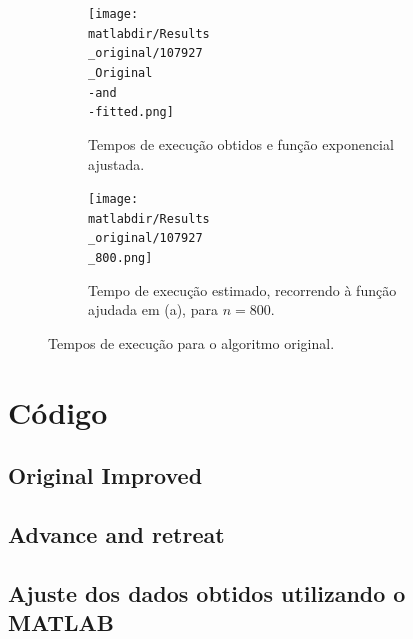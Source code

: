\documentclass[portuguese,11pt,a4paper,titlepage]{article}
\newcommand{\srcdir}{..}
\newcommand{\matlabdir}{"../MATLAB fittings"}
\begin{document}
\begin{figure}[h]
	\begin{subfigure}{0.47\textwidth}
	\texttt{[image: \\matlabdir/Results\\\_original/107927\\\_Original\\-and\\-fitted.png]} 
	\caption{Tempos de execução obtidos e função exponencial ajustada.}
	\label{fig:subim1}
	\end{subfigure}
	\hspace{0.049\textwidth}
	\begin{subfigure}{0.47\textwidth}
	\texttt{[image: \\matlabdir/Results\\\_original/107927\\\_800.png]}
	\caption{Tempo de execução estimado, recorrendo à função ajudada em (a), para \begin{math}n=800\end{math}.}
	\label{fig:original_800}
	\end{subfigure}
	
	\caption{Tempos de execução para o algoritmo original.}
	\vspace{-20pt}
	\label{fig:original}
\end{figure}
\pagebreak

\section{Código}
\subsection{Original Improved}

\pagebreak
\subsection{Advance and retreat}

\subsection{Ajuste dos dados obtidos utilizando o MATLAB}

\end{document}
